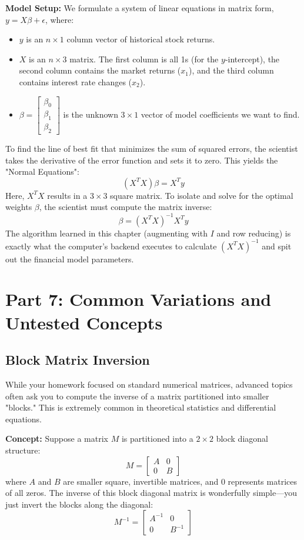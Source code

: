 \documentclass[12pt]{article}
\begin{document}
\textbf{Model Setup:}
We formulate a system of linear equations in matrix form, $y = X\beta + \epsilon$, where:
\begin{itemize}
    \item $y$ is an $n \times 1$ column vector of historical stock returns.
    \item $X$ is an $n \times 3$ matrix. The first column is all 1s (for the $y$-intercept), the second column contains the market returns ($x_1$), and the third column contains interest rate changes ($x_2$).
    \item $\beta = \begin{bmatrix} \beta_0 \\ \beta_1 \\ \beta_2 \end{bmatrix}$ is the unknown $3 \times 1$ vector of model coefficients we want to find.
\end{itemize}
To find the line of best fit that minimizes the sum of squared errors, the scientist takes the derivative of the error function and sets it to zero. This yields the "Normal Equations":
\[ (X^T X)\beta = X^T y \]
Here, $X^T X$ results in a $3 \times 3$ square matrix. To isolate and solve for the optimal weights $\beta$, the scientist must compute the matrix inverse:
\[ \beta = (X^T X)^{-1} X^T y \]
The algorithm learned in this chapter (augmenting with $I$ and row reducing) is exactly what the computer's backend executes to calculate $(X^T X)^{-1}$ and spit out the financial model parameters.

\newpage
\section{Part 7: Common Variations and Untested Concepts}

\subsection{Block Matrix Inversion}
While your homework focused on standard numerical matrices, advanced topics often ask you to compute the inverse of a matrix partitioned into smaller "blocks." This is extremely common in theoretical statistics and differential equations.

\textbf{Concept:} Suppose a matrix $M$ is partitioned into a $2 \times 2$ block diagonal structure:
\[ M = \begin{bmatrix} A & 0 \\ 0 & B \end{bmatrix} \]
where $A$ and $B$ are smaller square, invertible matrices, and $0$ represents matrices of all zeros.
The inverse of this block diagonal matrix is wonderfully simple—you just invert the blocks along the diagonal:
\[ M^{-1} = \begin{bmatrix} A^{-1} & 0 \\ 0 & B^{-1} \end{bmatrix} \]
\end{document}
